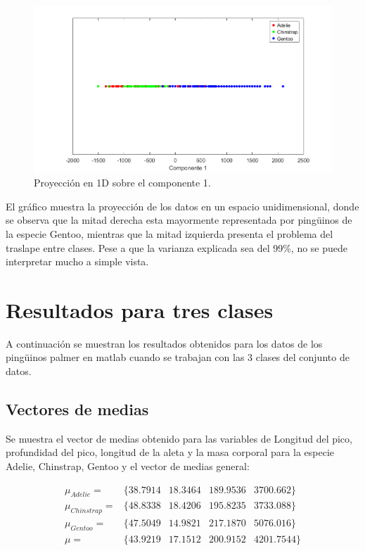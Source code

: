 \documentclass[11pt, letterpaper]{article}
\begin{document}
\begin{figure}[h!]
	\centering
	\begin{minipage}{1.1\textwidth}
		\centering
		\includegraphics[width=\textwidth]{IMG/G3.png}
		\caption{Proyección en 1D sobre el componente 1.}
		\label{fig:f5}
	\end{minipage}\hfill
\end{figure}

El gráfico muestra la proyección de los datos en un espacio unidimensional, donde se observa que la mitad derecha esta mayormente representada por pingüinos de la especie Gentoo, mientras que la mitad izquierda presenta el problema del traslape entre clases. Pese a que la varianza explicada sea del 99\%, no se puede interpretar mucho a simple vista.

\newpage

\section{Resultados para tres clases}

A continuación se muestran los resultados obtenidos para los datos de los pingüinos palmer en matlab cuando se trabajan con las 3 clases del conjunto de datos. 

\subsection{Vectores de medias}

Se muestra el vector de medias obtenido para las variables de Longitud del pico, profundidad del pico, longitud de la aleta y la masa corporal para la especie Adelie, Chinstrap, Gentoo y el vector de medias general:

$$
\begin{matrix}
	\mu_{Adelie} =  &\{38.7914 & 18.3464 & 189.9536 & 3700.662\}	 \\
	\mu_{Chinstrap} = & \{48.8338 & 18.4206 & 195.8235 & 3733.088\}	 \\
	\mu_{Gentoo} = & \{47.5049 & 14.9821 &  217.1870  & 5076.016\}	 \\
	\mu = & \{43.9219 & 17.1512 & 200.9152 & 4201.7544 \}	 
\end{matrix}
$$
\end{document}
